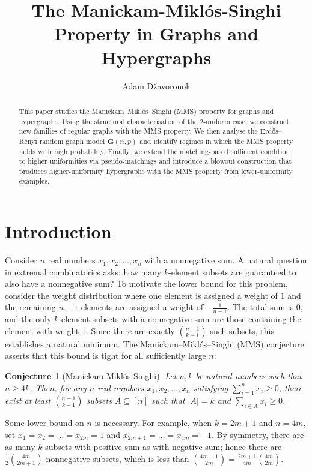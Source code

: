 \documentclass[12pt,UKenglish]{amsart}
\title{The Manickam-Mikl\'os-Singhi Property in Graphs and Hypergraphs}
\author{Adam D\v{z}avoronok}
\theoremstyle{plain}
\newtheorem{conj}[thm]{Conjecture}
\theoremstyle{definition}
\theoremstyle{remark}
\begin{document}
\begin{abstract}
This paper studies the Manickam--Mikl\'os--Singhi (MMS) property for graphs and hypergraphs. Using the structural characterisation of the $2$-uniform case, we construct new families of regular graphs with the MMS property. We then analyse the Erd\H{o}s--R\'enyi random graph model $\mathbf{G}(n,p)$ and identify regimes in which the MMS property holds with high probability. Finally, we extend the matching-based sufficient condition to higher uniformities via pseudo-matchings and introduce a blowout construction that produces higher-uniformity hypergraphs with the MMS property from lower-uniformity examples.
\end{abstract}
\raggedbottom %
\maketitle


\section{Introduction}

Consider $n$ real numbers $x_1, x_2, \dots, x_n$ with a nonnegative sum. A natural question in extremal combinatorics asks: how many $k$-element subsets are guaranteed to also have a nonnegative sum? To motivate the lower bound for this problem, consider the weight distribution where one element is assigned a weight of $1$ and the remaining $n-1$ elements are assigned a weight of $-\frac{1}{n-1}$. The total sum is $0$, and the only $k$-element subsets with a nonnegative sum are those containing the element with weight $1$. Since there are exactly $\binom{n-1}{k-1}$ such subsets, this establishes a natural minimum. The Manickam--Mikl\'os--Singhi (MMS) conjecture \cite{manickam1987number, manickam1988first} asserts that this bound is tight for all sufficiently large $n$:

\begin{conj}[Manickam-Mikl\'os-Singhi]\label{conj:mms}
  Let $n,k$ be natural numbers such that $n \ge 4k$. Then, for any $n$ real numbers $x_1, x_2, \dots, x_n$ satisfying $\sum_{i=1}^n x_i \ge 0$, there exist at least $\binom{n-1}{k-1}$ subsets $A \subseteq [n]$ such that $|A|=k$ and $\sum_{i \in A} x_i \ge 0$.
\end{conj}

Some lower bound on $n$ is necessary. For example, when $k=2m+1$ and $n=4m$, set $x_1=x_2=\dots=x_{2m}=1$ and $x_{2m+1}=\dots=x_{4m}=-1$. By symmetry, there are as many $k$-subsets with positive sum as with negative sum; hence there are $\frac{1}{2}\binom{4m}{2m+1}$ nonnegative subsets, which is less than $\binom{4m-1}{2m}=\frac{2m+1}{4m}\binom{4m}{2m}$.
\end{document}
